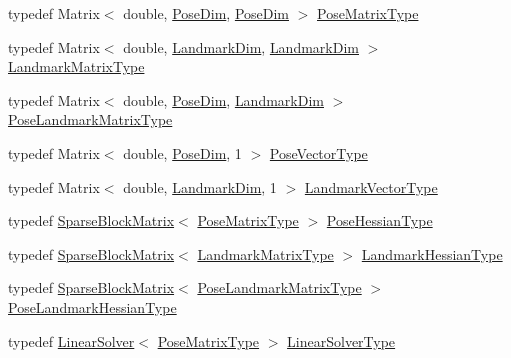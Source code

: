 \begin{DoxyCompactItemize}
\item 
typedef Matrix$<$ double, \hyperlink{structg2o_1_1BlockSolverTraits_a90a03bcfc60b629da5601f6df9514297}{Pose\+Dim}, \hyperlink{structg2o_1_1BlockSolverTraits_a90a03bcfc60b629da5601f6df9514297}{Pose\+Dim} $>$ \hyperlink{structg2o_1_1BlockSolverTraits_a35e6e4bad138dcfcaa3b1339e168bf30}{Pose\+Matrix\+Type}
\item 
typedef Matrix$<$ double, \hyperlink{structg2o_1_1BlockSolverTraits_a7e6e33971e5243e020a9f41cd3182218}{Landmark\+Dim}, \hyperlink{structg2o_1_1BlockSolverTraits_a7e6e33971e5243e020a9f41cd3182218}{Landmark\+Dim} $>$ \hyperlink{structg2o_1_1BlockSolverTraits_add9b9fbfef352b7654d41914d5eaa58c}{Landmark\+Matrix\+Type}
\item 
typedef Matrix$<$ double, \hyperlink{structg2o_1_1BlockSolverTraits_a90a03bcfc60b629da5601f6df9514297}{Pose\+Dim}, \hyperlink{structg2o_1_1BlockSolverTraits_a7e6e33971e5243e020a9f41cd3182218}{Landmark\+Dim} $>$ \hyperlink{structg2o_1_1BlockSolverTraits_a91e6510ad42179701d22c3ac312237cd}{Pose\+Landmark\+Matrix\+Type}
\item 
typedef Matrix$<$ double, \hyperlink{structg2o_1_1BlockSolverTraits_a90a03bcfc60b629da5601f6df9514297}{Pose\+Dim}, 1 $>$ \hyperlink{structg2o_1_1BlockSolverTraits_a032ed57e9bc44c36093f97b32e1506f6}{Pose\+Vector\+Type}
\item 
typedef Matrix$<$ double, \hyperlink{structg2o_1_1BlockSolverTraits_a7e6e33971e5243e020a9f41cd3182218}{Landmark\+Dim}, 1 $>$ \hyperlink{structg2o_1_1BlockSolverTraits_af5154a15abb566ff5bffc0adb9f0458d}{Landmark\+Vector\+Type}
\item 
typedef \hyperlink{classg2o_1_1SparseBlockMatrix}{Sparse\+Block\+Matrix}$<$ \hyperlink{structg2o_1_1BlockSolverTraits_a35e6e4bad138dcfcaa3b1339e168bf30}{Pose\+Matrix\+Type} $>$ \hyperlink{structg2o_1_1BlockSolverTraits_a03351362339d8e6609c577123350bb2a}{Pose\+Hessian\+Type}
\item 
typedef \hyperlink{classg2o_1_1SparseBlockMatrix}{Sparse\+Block\+Matrix}$<$ \hyperlink{structg2o_1_1BlockSolverTraits_add9b9fbfef352b7654d41914d5eaa58c}{Landmark\+Matrix\+Type} $>$ \hyperlink{structg2o_1_1BlockSolverTraits_ae761bb32d5267e4d74e5d9c2c7e7ad2f}{Landmark\+Hessian\+Type}
\item 
typedef \hyperlink{classg2o_1_1SparseBlockMatrix}{Sparse\+Block\+Matrix}$<$ \hyperlink{structg2o_1_1BlockSolverTraits_a91e6510ad42179701d22c3ac312237cd}{Pose\+Landmark\+Matrix\+Type} $>$ \hyperlink{structg2o_1_1BlockSolverTraits_af8ef27915a056caae3b12a9ca609eba6}{Pose\+Landmark\+Hessian\+Type}
\item 
typedef \hyperlink{classg2o_1_1LinearSolver}{Linear\+Solver}$<$ \hyperlink{structg2o_1_1BlockSolverTraits_a35e6e4bad138dcfcaa3b1339e168bf30}{Pose\+Matrix\+Type} $>$ \hyperlink{structg2o_1_1BlockSolverTraits_add6edae08cb0665c2b1e7c641cdb4dc4}{Linear\+Solver\+Type}
\end{DoxyCompactItemize}
